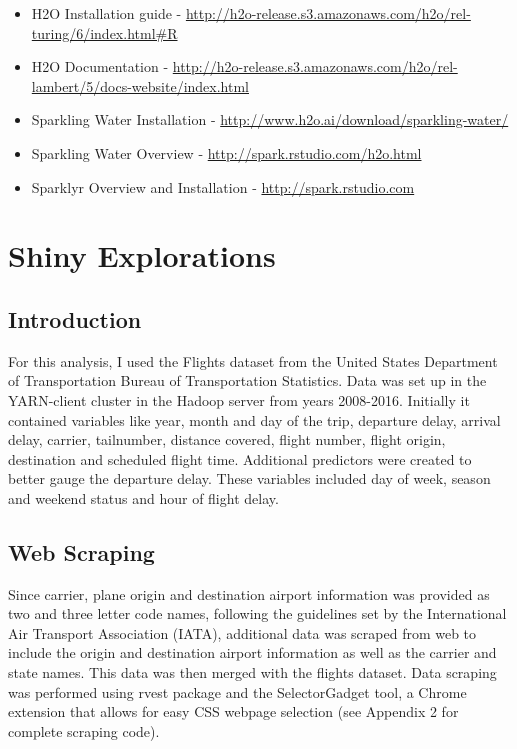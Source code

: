 \documentclass[12pt,twoside]{amherstthesis}
\begin{document}
  \begin{itemize}
  \item
    H2O Installation guide -
    \url{http://h2o-release.s3.amazonaws.com/h2o/rel-turing/6/index.html\#R}
  \item
    H2O Documentation -
    \url{http://h2o-release.s3.amazonaws.com/h2o/rel-lambert/5/docs-website/index.html}
  \item
    Sparkling Water Installation -
    \url{http://www.h2o.ai/download/sparkling-water/}
  \item
    Sparkling Water Overview - \url{http://spark.rstudio.com/h2o.html}
  \item
    Sparklyr Overview and Installation - \url{http://spark.rstudio.com}
  \end{itemize}
  
  \chapter{Shiny Explorations}\label{shiny-explorations}
  
  \section{Introduction}\label{introduction-1}
  
  For this analysis, I used the Flights dataset from the United States
  Department of Transportation Bureau of Transportation Statistics. Data
  was set up in the YARN-client cluster in the Hadoop server from years
  2008-2016. Initially it contained variables like year, month and day of
  the trip, departure delay, arrival delay, carrier, tailnumber, distance
  covered, flight number, flight origin, destination and scheduled flight
  time. Additional predictors were created to better gauge the departure
  delay. These variables included day of week, season and weekend status
  and hour of flight delay.
  
  \section{Web Scraping}\label{web-scraping}
  
  Since carrier, plane origin and destination airport information was
  provided as two and three letter code names, following the guidelines
  set by the International Air Transport Association (IATA), additional
  data was scraped from web to include the origin and destination airport
  information as well as the carrier and state names. This data was then
  merged with the flights dataset. Data scraping was performed using rvest
  package and the SelectorGadget tool, a Chrome extension that allows for
  easy CSS webpage selection (see Appendix 2 for complete scraping code).
  
\end{document}
